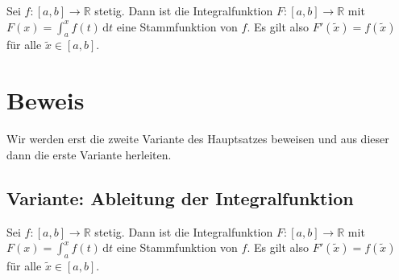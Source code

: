 \documentclass[fontsize=9pt,
               parskip=half-,
               DIV=14,
               listof=chapterentry,
               tocflat]{scrbook}
\begin{document}
\begin{theorem*}
Sei $f:[a,b]\to \mathbb {R} $ stetig. Dann ist die Integralfunktion $F:[a,b]\to \mathbb {R} $ mit $F(x)=\int _{a}^{x}f(t)\,\mathrm {d} t$ eine Stammfunktion von $f$. Es gilt also $F'({\tilde {x}})=f({\tilde {x}})$ für alle ${\tilde {x}}\in [a,b]$.

\end{theorem*}

\section{Beweis}

Wir werden erst die zweite Variante des Hauptsatzes beweisen und aus dieser dann die erste Variante herleiten.

\subsection{Variante: Ableitung der Integralfunktion}

\begin{theorem*}
Sei $f:[a,b]\to \mathbb {R} $ stetig. Dann ist die Integralfunktion $F:[a,b]\to \mathbb {R} $ mit $F(x)=\int _{a}^{x}f(t)\,\mathrm {d} t$ eine Stammfunktion von $f$. Es gilt also $F'({\tilde {x}})=f({\tilde {x}})$ für alle ${\tilde {x}}\in [a,b]$.

\end{theorem*}
\end{document}
